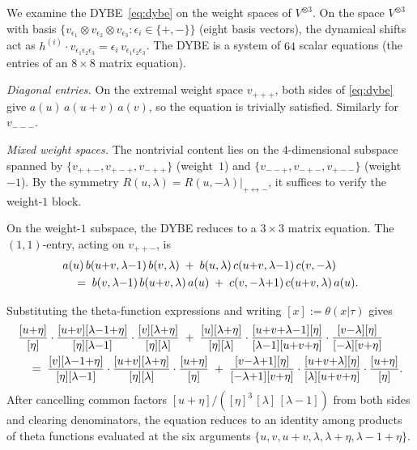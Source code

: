 \begin{computation}
\label{comp:dybe-matrix-entries}
We examine the DYBE~\eqref{eq:dybe} on the weight spaces of
$V^{\otimes 3}$. On the space $V^{\otimes 3}$
with basis $\{v_{\epsilon_1} \otimes v_{\epsilon_2}
\otimes v_{\epsilon_3} : \epsilon_i \in \{+,-\}\}$
(eight basis vectors), the dynamical shifts act as
$h^{(i)} \cdot v_{\epsilon_1\epsilon_2\epsilon_3}
= \epsilon_i\,v_{\epsilon_1\epsilon_2\epsilon_3}$.
The DYBE is a system of $64$ scalar equations (the entries of
an $8 \times 8$ matrix equation).

\emph{Diagonal entries.}
On the extremal weight space $v_{+++}$, both sides of
\eqref{eq:dybe} give
$a(u)\,a(u{+}v)\,a(v)$, so the equation is trivially satisfied.
Similarly for $v_{---}$.

\emph{Mixed weight spaces.}
The nontrivial content lies on the $4$-dimensional subspace
spanned by $\{v_{++-}, v_{+-+}, v_{-++}\}$ (weight~$1$)
and $\{v_{--+}, v_{-+-}, v_{+--}\}$ (weight~$-1$).
By the symmetry $R(u,\lambda) = R(u,-\lambda)|_{+\leftrightarrow -}$,
it suffices to verify the weight-$1$ block.

On the weight-$1$ subspace, the DYBE
reduces to a $3 \times 3$ matrix equation.
The $(1,1)$-entry, acting on $v_{++-}$, is
\begin{align}\label{eq:dybe-11}
&a(u)\,b(u{+}v, \lambda{-}1)\,b(v,\lambda) \;+\;
b(u,\lambda)\,c(u{+}v, \lambda{-}1)\,c(v,-\lambda) \notag \\
&\quad =\;
b(v,\lambda{-}1)\,b(u{+}v,\lambda)\,a(u) \;+\;
c(v,{-}\lambda{+}1)\,c(u{+}v,\lambda)\,a(u).
\end{align}

Substituting the theta-function expressions and writing
$[x] := \theta(x|\tau)$ gives
\begin{align}\label{eq:dybe-11-theta}
&\frac{[u{+}\eta]}{[\eta]}\cdot
\frac{[u{+}v][\lambda{-}1{+}\eta]}{[\eta][\lambda{-}1]}
\cdot
\frac{[v][\lambda{+}\eta]}{[\eta][\lambda]}
\;+\;
\frac{[u][\lambda{+}\eta]}{[\eta][\lambda]}
\cdot
\frac{[u{+}v{+}\lambda{-}1][\eta]}{[\lambda{-}1][u{+}v{+}\eta]}
\cdot
\frac{[v{-}\lambda][\eta]}{[-\lambda][v{+}\eta]} \notag \\
&\quad =\;
\frac{[v][\lambda{-}1{+}\eta]}{[\eta][\lambda{-}1]}
\cdot
\frac{[u{+}v][\lambda{+}\eta]}{[\eta][\lambda]}
\cdot
\frac{[u{+}\eta]}{[\eta]} \;+\;
\frac{[v{-}\lambda{+}1][\eta]}{[-\lambda{+}1][v{+}\eta]}
\cdot
\frac{[u{+}v{+}\lambda][\eta]}{[\lambda][u{+}v{+}\eta]}
\cdot
\frac{[u{+}\eta]}{[\eta]}.
\end{align}
After cancelling common factors $[u{+}\eta]/([\eta]^3\,[\lambda]\,
[\lambda{-}1])$ from both sides and clearing denominators, the
equation reduces to an identity among products of theta functions
evaluated at the six arguments $\{u, v, u{+}v, \lambda,
\lambda{+}\eta, \lambda{-}1{+}\eta\}$.
\end{computation}

